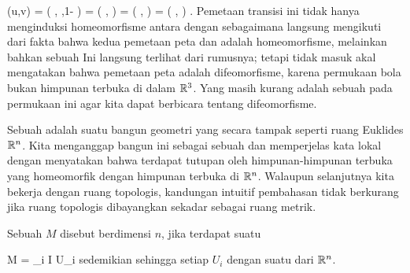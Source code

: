 {\mavergleichskettealignhandlinks
{\vergleichskettealignhandlinks
{ \psi(u,v)
}
{ =} { \beta \left(  {  }, {  } ,1- {  }  \right)
}
{ =} { \left(  {  } , {  }  \right)
}
{ =} { \left(  {  } , {  }  \right)
}
{ =} { \left(  {  } , {  }  \right)
}
}
{}
{}{.}
Pemetaan transisi ini tidak hanya menginduksi homeomorfisme antara  dengan  sebagaimana langsung mengikuti dari fakta bahwa kedua pemetaan peta \mathkor {} {\alpha} {dan} {\beta} {} adalah homeomorfisme, melainkan bahkan sebuah  Ini langsung terlihat dari rumusnya; tetapi tidak masuk akal mengatakan bahwa pemetaan peta adalah difeomorfisme, karena permukaan bola bukan himpunan terbuka di dalam ${\mathbb R}^3$. Yang masih kurang adalah sebuah  pada permukaan ini agar kita dapat berbicara tentang difeomorfisme.

}
Sebuah  {} adalah suatu bangun geometri yang secara  tampak seperti ruang Euklides ${\mathbb R}^n$. Kita menganggap bangun ini sebagai sebuah
dan memperjelas kata lokal dengan menyatakan bahwa terdapat tutupan oleh himpunan-himpunan terbuka yang homeomorfik dengan himpunan terbuka di ${\mathbb R}^n$. Walaupun selanjutnya kita bekerja dengan ruang topologis, kandungan intuitif pembahasan tidak berkurang jika ruang topologis dibayangkan sekadar sebagai ruang metrik.


{}
{

Sebuah
$M$ disebut  berdimensi  $n$, jika terdapat suatu

\mavergleichskette
{\vergleichskette
{ M
}
{ = }{  \bigcup_{i \in I} U_i
}
{  }{
}
{    }{
}
{   }{
}
}
{}{}{}
sedemikian sehingga setiap $U_i$
dengan suatu
dari ${\mathbb R}^n$.

}

